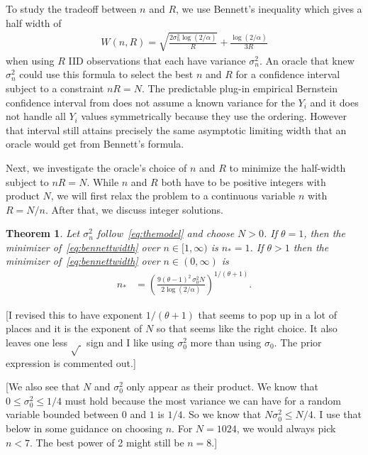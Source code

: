 \documentclass{article}
\newtheorem{theorem}{Theorem}
\newcommand{\art}[1]{\begingroup\color{blue}#1\endgroup}
\renewcommand{\le}{\leqslant}
\begin{document}
To study the tradeoff between $n$ and $R$, we use Bennett's 
inequality which gives a half width of
\begin{align}\label{eq:bennettwidth}
W(n,R)=\sqrt{\frac{2\sigma_n^2\log(2/\alpha)}R}
+ \frac{\log(2/\alpha)}{3R}
\end{align}
when using $R$ IID observations that each have variance
$\sigma^2_n$. An oracle that knew $\sigma^2_n$ could
use this formula to select the best $n$ and $R$
for a confidence interval subject to a constraint $nR=N$.
The predictable plug-in empirical Bernstein confidence interval
from \cite{WauRam24a} does not assume a known variance
for the $Y_i$ and it does not handle all $Y_i$ values
symmetrically because they use the ordering.  However
that interval still attains precisely the same asymptotic limiting width
that an oracle would get from Bennett's formula. 

Next, we investigate the oracle's choice of $n$ and $R$
to minimize the half-width subject to $nR=N$. 
While $n$ and $R$ both have to be positive integers
with product $N$, we will first relax the problem
to a continuous variable $n$ with $R=N/n$.  After that, we
discuss integer solutions.

\begin{theorem}\label{thm:goodn}
Let $\sigma^2_n$ follow~\eqref{eq:themodel} and choose $N>0$.
If $\theta=1$, then the minimizer of~\eqref{eq:bennettwidth} 
over $n\in[1,\infty)$ is $n_*=1$.
If $\theta>1$ then the minimizer of~\eqref{eq:bennettwidth}
over $n\in(0,\infty)$ is 
\begin{align}\label{eq:goodn}
n_*& 
 = 
\left(\frac{9(\theta-1)^2\,\sigma_0^2
N}{2\log(2/\alpha)}\right)^{1/(\theta+1)}.
\end{align}\end{theorem}
\art{[I revised this to have exponent $1/(\theta+1)$
that seems to pop up in a lot of places and it is the
exponent of $N$ so that seems like the right choice. It also
leaves one less $\sqrt{\ }$ sign and I like using $\sigma_0^2$ more
than using $\sigma_0$. The prior expression is commented out.]} 

\art{[We also see that $N$ and $\sigma^2_0$ only appear
as their product.  We know that $0\le\sigma_0^2\le1/4$ must hold because
the most variance we can have for a random variable bounded between
$0$ and $1$ is $1/4$. So we know that $N\sigma_0^2\le N/4$. I use that
below in some guidance on choosing $n$. For $N=1024$, we would
always pick $n<7$. The best power of 2 might still be $n=8$.]}
\end{document}

